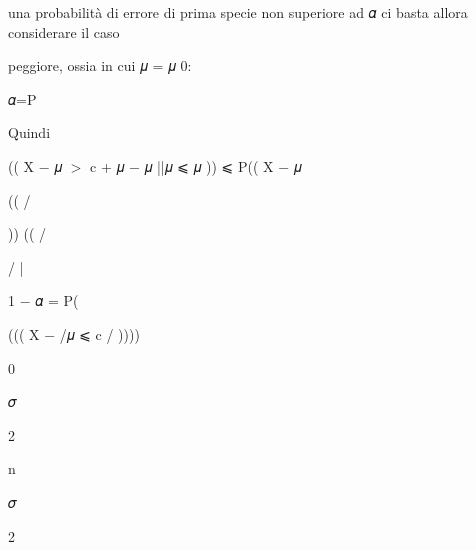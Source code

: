 \documentclass[a4paper,portrait,12pt]{article}
\begin{document}
\begin{flushleft}
una probabilit\`{a} di errore di prima specie non superiore ad 𝛼 ci basta allora considerare il caso
\end{flushleft}


\begin{flushleft}
peggiore, ossia in cui 𝜇 = 𝜇 0:
\end{flushleft}


\begin{flushleft}
𝛼=P
\end{flushleft}


\begin{flushleft}
Quindi
\end{flushleft}





\begin{flushleft}
(( X $-$ 𝜇 $>$ c + 𝜇 $-$ 𝜇 ||𝜇 ⩽ 𝜇 )) ⩽ P(( X $-$ 𝜇
\end{flushleft}


(( /


)) (( /


/ |


\begin{flushleft}
1 $-$ 𝛼 = P(
\end{flushleft}


\begin{flushleft}
((( X $-$ /𝜇 ⩽ c / ))))
\end{flushleft}


0





\begin{flushleft}
𝜎
\end{flushleft}





2





\begin{flushleft}
n
\end{flushleft}





\begin{flushleft}
𝜎
\end{flushleft}





2
\end{document}

